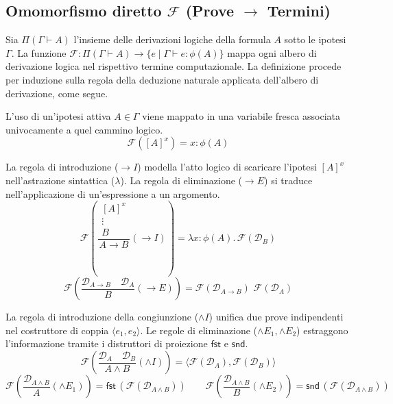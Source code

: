 \subsection{Omomorfismo diretto \texorpdfstring{$\mathcal{F}$}{F} (Prove \texorpdfstring{$\to$}{to} Termini)}
Sia $\Pi(\Gamma \vdash A)$ l'insieme delle derivazioni logiche della formula $A$ sotto le ipotesi $\Gamma$. La funzione $\mathcal{F}: \Pi(\Gamma \vdash A) \to \{ e \mid \Gamma \vdash e : \phi(A) \}$ 
mappa ogni albero di derivazione logica nel rispettivo termine computazionale. La definizione procede per induzione sulla regola della deduzione naturale applicata dell'albero di derivazione, come segue.
\begin{description}[leftmargin=1.5em, style=nextline, font=\bfseries]
    \item[Assioma / Ipotesi] 
        L'uso di un'ipotesi attiva $A \in \Gamma$ viene mappato in una variabile fresca associata univocamente a quel cammino logico.
        $$ \mathcal{F}\left( [A]^x \right) = x : {\phi(A)} $$
    \item[Implicazione ($\to$)] 
        La regola di introduzione ($\to I$) modella l'atto logico di scaricare l'ipotesi $[A]^x$ nell'astrazione sintattica ($\lambda$). 
        La regola di eliminazione ($\to E$) si traduce nell'applicazione di un'espressione a un argomento.
        $$ \mathcal{F}\left( \frac{\begin{array}{c} [A]^x \\ \vdots \\ B \end{array}}{A \to B} (\to I) \right) = \lambda x:\phi(A). \, \mathcal{F}(\mathcal{D}_B) $$ 
        $$ \mathcal{F}\left( \frac{\mathcal{D}_{A \to B} \quad \mathcal{D}_A}{B} (\to E) \right) = \mathcal{F}(\mathcal{D}_{A \to B}) \,\, \mathcal{F}(\mathcal{D}_A) $$
    \item[Congiunzione ($\land$)] 
        La regola di introduzione della congiunzione ($\land I$) unifica due prove indipendenti nel costruttore di coppia $\langle e_1, e_2 \rangle$. 
        Le regole di eliminazione ($\land E_1, \land E_2$) estraggono l'informazione tramite i distruttori di proiezione $\mathsf{fst}$ e $\mathsf{snd}$.
        $$ \mathcal{F}\left( \frac{\mathcal{D}_A \quad \mathcal{D}_B}{A \land B} (\land I) \right) = \langle \mathcal{F}(\mathcal{D}_A), \mathcal{F}(\mathcal{D}_B) \rangle $$
        $$ \mathcal{F}\left( \frac{\mathcal{D}_{A \land B}}{A} (\land E_1) \right) = \mathsf{fst} \, (\mathcal{F}(\mathcal{D}_{A \land B})) \qquad 
           \mathcal{F}\left( \frac{\mathcal{D}_{A \land B}}{B} (\land E_2) \right) = \mathsf{snd} \, (\mathcal{F}(\mathcal{D}_{A \land B})) $$

\end{description}
